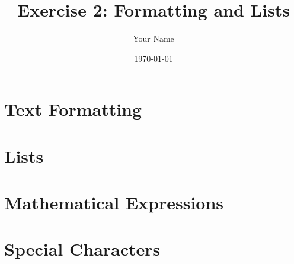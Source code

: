 \documentclass{article}
\title{Exercise 2: Formatting and Lists}
\author{Your Name}
\date{\today}
\begin{document}
\maketitle

\section{Text Formatting}

\section{Lists}

\section{Mathematical Expressions}

\section{Special Characters}
\end{document}
